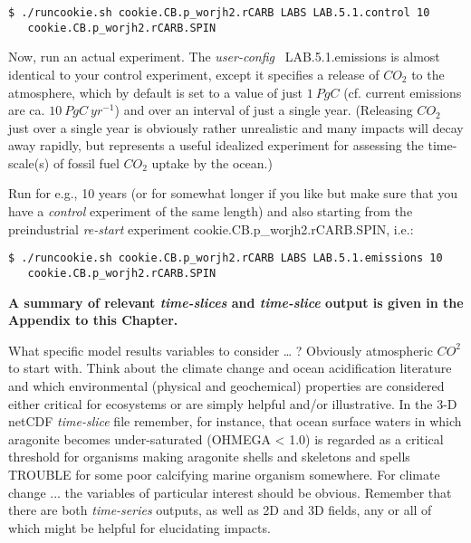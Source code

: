 \small\begin{verbatim}
$ ./runcookie.sh cookie.CB.p_worjh2.rCARB LABS LAB.5.1.control 10 
   cookie.CB.p_worjh2.rCARB.SPIN
\end{verbatim}\normalsize

\noindent Now, run an actual experiment. The \textit{user-config} \textsf{\footnotesize\ LAB.5.1.emissions} is almost identical to your control experiment, except it specifies a release of \(CO_{2}\) to the atmosphere, which by default is set to a value of just \(1\:PgC\) (cf. current emissions are ca. \(10\:PgC\:yr^{-1}\)) and over an interval of just a single year. (Releasing \(CO_{2}\) just over a single year is obviously rather unrealistic and many impacts will decay away rapidly, but represents a useful idealized experiment for assessing the time-scale(s) of fossil fuel \(CO_{2}\) uptake by the ocean.)

Run for e.g., 10 years (or for somewhat longer if you like but make sure that you have a \textit{control} experiment of the same length) and also starting from the preindustrial \textit{re-start} experiment \textsf{\footnotesize cookie.CB.p\_worjh2.rCARB.SPIN}, i.e.:
\small\begin{verbatim}
$ ./runcookie.sh cookie.CB.p_worjh2.rCARB LABS LAB.5.1.emissions 10 
   cookie.CB.p_worjh2.rCARB.SPIN
\end{verbatim}\normalsize

\noindent \textbf{A summary of relevant \textit{time-slices} and \textit{time-slice} output is given in the Appendix to this Chapter.}

\vspace{1mm}

\noindent What specific model results variables to consider … ? Obviously atmospheric $CO^{2}$ to start with. Think about the climate change and ocean acidification literature and which environmental (physical and geochemical) properties are considered either critical for ecosystems or are simply helpful and/or illustrative. In the 3-D netCDF \textit{time-slice} file remember, for instance, that ocean surface waters in which aragonite becomes under-saturated (OHMEGA < 1.0) is regarded as a critical threshold for organisms making aragonite shells and skeletons and spells TROUBLE for some poor calcifying marine organism somewhere. For climate change ... the variables of particular interest should be obvious. Remember that there are both \textit{time-series} outputs, as well as  2D and 3D fields, any or all of which might be  helpful for elucidating impacts.

